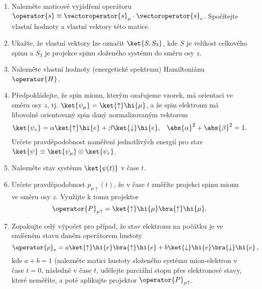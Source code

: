 	\begin{enumerate}
		\item 
			Nalezněte maticové vyjádření operátoru $\operator{s}\equiv\vectoroperator{s}_{\mu}\cdot\vectoroperator{s}_{e}$.			
			Spočítejte vlastní hodnoty a vlastní vektory této matice.
			
		\item
			Ukažte, že vlastní vektory lze označit $\ket{S,S_{3}}$, kde $S$ je velikost celkového spinu a $S_{3}$ je projekce spinu složeného systému do směru osy $z$.
		
		\item
			Nalezněte vlastní hodnoty (energetické spektrum) Hamiltoniánu $\operator{H}$.
		
		\item
			Předpokládejte, že spin mionu, kterým ozařujeme vzorek, má orientaci ve směru osy $z$, tj. $\ket{\psi_{\mu}}=\ket{\uparrow}\hi{\mu}$, a že spin elektronu má libovolně orientovaný spin daný normalizovaným vektorem
			\begin{align}
			\label{eq:mioniumes}
				\ket{\psi_{e}}&=\alpha\ket{\uparrow}\hi{e}+\beta\ket{\downarrow}\hi{e}, &
				\abs{\alpha}^{2}+\abs{\beta}^{2}&=1.
			\end{align}			
			Určete pravděpodobnost naměření jednotlivých energií pro stav $\ket{\psi}\equiv\ket{\psi_{\mu}}\otimes\ket{\psi_{e}}$.
			
		\item
			Nalezněte stav systému $\ket{\psi(t)}$ v čase $t$.
			
		\item
			Určete pravděpodobnost $p_{\mu\uparrow}(t)$, že v čase $t$ změříte projekci spinu mionu	ve směru osy $z$. 
			Využijte k tomu projektor 
			\begin{equation}
			\label{eq:Pmuup}
				\operator{P}_{\mu\uparrow}=\ket{\uparrow}\hi{\mu}\bra{\uparrow}\hi{\mu}.
			\end{equation}
			
		\item 
			Zopakujte celý výpočet pro případ, že stav elektronu na počátku je ve smíšeném stavu daném operátorem hustoty 
			\begin{equation}
			\label{eq:mioniumedm}
				\operator{\rho}_{e}=a\ket{\uparrow}\hi{e}\bra{\uparrow}\hi{e}+b\ket{\downarrow}\hi{e}\bra{\downarrow}\hi{e}\,,
			\end{equation}
			kde $a+b=1$	(nalezněte matici hustoty složeného systému mion-elektron v čase $t=0$, následně v čase $t$, udělejte parciální stopu přes elektronové stavy, které neměříte, a poté aplikujte projektor $\operator{P}_{\mu\uparrow}$.
\end{enumerate}

